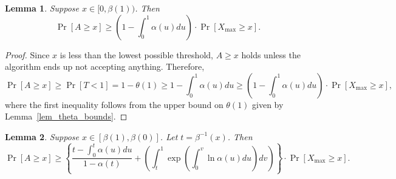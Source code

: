 \documentclass[10pt, letterpaper, twoside]{article}
\newtheorem{lemma}{Lemma}
\begin{document}
\begin{lemma}\label{lem_small}
Suppose $x\in[0,\beta(1))$. Then
\[\Pr[A\geq x]\geq\left(1-\int_0^1\alpha(u)du\right)\cdot\Pr[X_{\max}\geq x]\text{.}\]
\end{lemma}

\begin{proof}
Since $x$ is less than the lowest possible threshold, $A\geq x$ holds unless the algorithm ends up not accepting anything. Therefore,
\[\Pr[A\geq x]\geq\Pr[T<1]=1-\theta(1)\geq1-\int_0^1\alpha(u)du\geq\left(1-\int_0^1\alpha(u)du\right)\cdot\Pr[X_{\max}\geq x]\text{,}\]
where the first inequality follows from the upper bound on $\theta(1)$ given by Lemma~\ref{lem_theta_bounds}.
\end{proof}

\begin{lemma}\label{lem_main}
Suppose $x\in[\beta(1),\beta(0)]$. Let $t=\beta^{-1}(x)$. Then
\[\Pr[A\geq x]\geq\left\{\frac{t-\int_0^t\alpha(u)du}{1-\alpha(t)}+\left(\int_t^1\exp\left(\int_0^v\ln\alpha(u)du\right)dv\right)\right\}\cdot\Pr[X_{\max}\geq x]\text{.}\]
\end{lemma}
\end{document}
